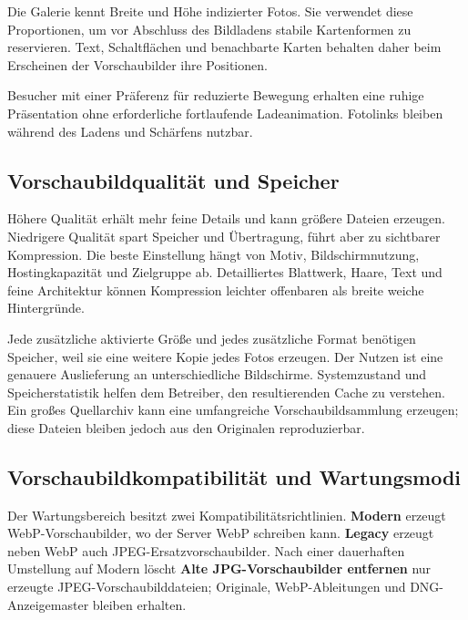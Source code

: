 \documentclass[11pt,a4paper]{article}
\newcommand{\ui}[1]{\textbf{#1}}
\begin{document}
Die Galerie kennt Breite und Höhe indizierter Fotos. Sie verwendet diese
Proportionen, um vor Abschluss des Bildladens stabile Kartenformen zu
reservieren. Text, Schaltflächen und benachbarte Karten behalten daher beim
Erscheinen der Vorschaubilder ihre Positionen.

Besucher mit einer Präferenz für reduzierte Bewegung erhalten eine ruhige
Präsentation ohne erforderliche fortlaufende Ladeanimation. Fotolinks bleiben
während des Ladens und Schärfens nutzbar.

\subsection{Vorschaubildqualität und Speicher}

Höhere Qualität erhält mehr feine Details und kann größere Dateien erzeugen.
Niedrigere Qualität spart Speicher und Übertragung, führt aber zu sichtbarer
Kompression. Die beste Einstellung hängt von Motiv, Bildschirmnutzung,
Hostingkapazität und Zielgruppe ab. Detailliertes Blattwerk, Haare, Text und
feine Architektur können Kompression leichter offenbaren als breite weiche
Hintergründe.

Jede zusätzliche aktivierte Größe und jedes zusätzliche Format benötigen
Speicher, weil sie eine weitere Kopie jedes Fotos erzeugen. Der Nutzen ist eine
genauere Auslieferung an unterschiedliche Bildschirme. Systemzustand und
Speicherstatistik helfen dem Betreiber, den resultierenden Cache zu verstehen.
Ein großes Quellarchiv kann eine umfangreiche Vorschaubildsammlung erzeugen;
diese Dateien bleiben jedoch aus den Originalen reproduzierbar.

\subsection{Vorschaubildkompatibilität und Wartungsmodi}

Der Wartungsbereich besitzt zwei Kompatibilitätsrichtlinien. \ui{Modern} erzeugt
WebP-Vor\-schau\-bil\-der, wo der Server WebP schreiben kann. \ui{Legacy}
erzeugt neben WebP auch JPEG-Ersatzvorschaubilder. Nach einer dauerhaften
Umstellung auf Modern löscht \ui{Alte JPG-Vorschaubilder entfernen} nur erzeugte
JPEG-Vorschaubilddateien; Originale, WebP-Ableitungen und DNG-Anzeigemaster
bleiben erhalten.
\end{document}
